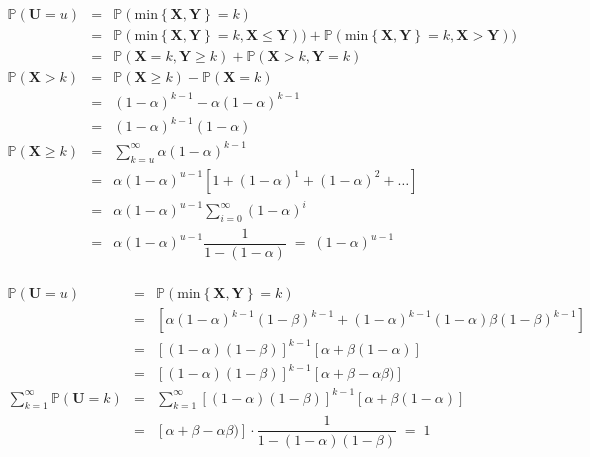 \documentclass[a4paper, 11pt]{article}
\begin{document}
\begin{equation*}
\begin{array}{lclll}
\mathds{P}(\mathbf{U} = u) & = &  \mathds{P}(\mathrm{min}\left\{ \mathbf{X}, \mathbf{Y} \right\} = k) \\
& = &  \mathds{P}(\mathrm{min}\left\{ \mathbf{X}, \mathbf{Y} \right\} = k, \mathbf{X} \leq \mathbf{Y})) + \mathds{P}(\mathrm{min}\left\{ \mathbf{X}, \mathbf{Y} \right\} = k, \mathbf{X} > \mathbf{Y})) \\

& = &  \mathds{P}(\mathbf{X} = k, \mathbf{Y} \geq k) + \mathds{P}(\mathbf{X} > k, \mathbf{Y}= k) \\[25pt]

\mathds{P}(\mathbf{X} > k) & = &  \mathds{P}(\mathbf{X} \geq k) - \mathds{P}(\mathbf{X} = k)\\
& = &  (1-\alpha)^{k-1} - \alpha(1-\alpha)^{k-1} \\
& = &  (1-\alpha)^{k-1} (1-\alpha) \\[25pt]

\mathds{P}(\mathbf{X} \geq k) & = &  \displaystyle\sum_{k=u}^{\infty}\alpha(1-\alpha)^{k-1} \\
& = &  \alpha(1-\alpha)^{u-1} \left[ 1 + (1-\alpha)^{1} + (1-\alpha)^{2} + \ldots \right] \\
& = &  \alpha(1-\alpha)^{u-1} \displaystyle\sum_{i=0}^{\infty}(1-\alpha)^{i} \\
& = &  \alpha(1-\alpha)^{u-1} \dfrac{1}{1-(1-\alpha)} \; = \; (1-\alpha)^{u-1} \\[25pt]

\end{array}
\end{equation*}

\begin{equation*}
\begin{array}{lclll}

\mathds{P}(\mathbf{U} = u) & = &  \mathds{P}(\mathrm{min}\left\{ \mathbf{X}, \mathbf{Y} \right\} = k) \\

& = & \left[ \alpha(1-\alpha)^{k-1}(1-\beta)^{k-1} + (1-\alpha)^{k-1}(1-\alpha)\beta(1-\beta)^{k-1} \right] \\

& = &  \left[ (1-\alpha)(1-\beta) \right]^{k-1}\left[ \alpha + \beta(1-\alpha) \right] \\

& = &  \left[ (1-\alpha)(1-\beta) \right]^{k-1}\left[ \alpha + \beta -\alpha\beta) \right] \\[25pt]

\displaystyle\sum_{k=1}^{\infty}\mathds{P}(\mathbf{U} = k) & = & \displaystyle\sum_{k=1}^{\infty} \left[ (1-\alpha)(1-\beta) \right]^{k-1}\left[ \alpha + \beta(1-\alpha) \right]\\

& = & \left[ \alpha + \beta -\alpha\beta) \right]\cdot \dfrac{1}{1-(1-\alpha)(1-\beta)} \; = \; 1
 
\end{array}
\end{equation*}
\end{document}
